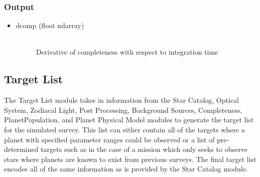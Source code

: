 \documentclass[cleanfoot]{asme2ej}
\begin{document}
\subsubsection*{Output}
\begin{itemize}
\item 
\begin{description}
    \item[dcomp (float ndarray)] \hfill \\
        Derivative of completeness with respect to integration time
\end{description}
\end{itemize}


\subsection{Target List}
The Target List module takes in information from the Star Catalog, Optical System, Zodiacal Light, Post Processing, Background Sources, Completeness, PlanetPopulation, and Planet Physical Model modules to generate the target list for the simulated survey.  This list can either contain all of the targets where a planet with specified parameter ranges could be observed or a list of pre-determined targets such as in the case of a mission which only seeks to observe stars where planets are known to exist from previous surveys.  The final target list encodes all of the same information as is provided by the Star Catalog module.
\end{document}
